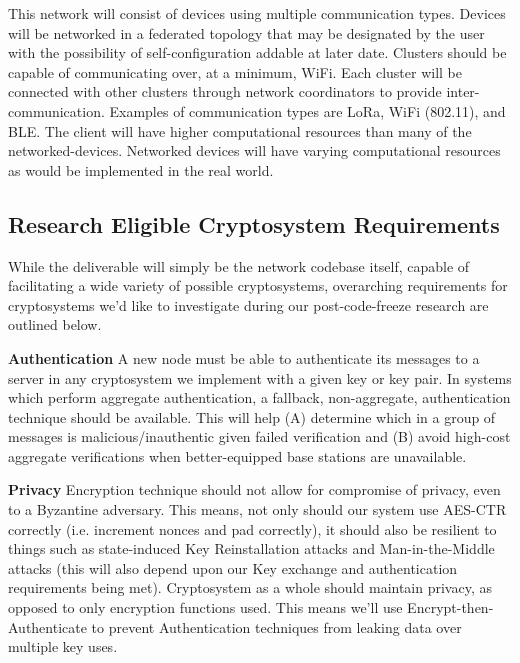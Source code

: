 \documentclass[tikz,a4paper,titlepage]{article}
\begin{document}
This network will consist of devices using multiple communication types. Devices will be networked in a federated topology that may be designated by the user with the possibility of self-configuration addable at later date. Clusters should be capable of communicating over, at a minimum, WiFi. Each cluster will be connected with other clusters through network coordinators to provide inter-communication. Examples of communication types are LoRa, WiFi (802.11), and BLE. The client will have higher computational resources than many of the networked-devices. Networked devices will have varying computational resources as would be implemented in the real world. 

\subsection{Research Eligible Cryptosystem Requirements} %

While the deliverable will simply be the network codebase itself, capable of facilitating a wide variety of possible cryptosystems, overarching requirements for cryptosystems we'd like to investigate during our post-code-freeze research are outlined below.
    
\textbf{Authentication}
A new node must be able to authenticate its messages to a server in any cryptosystem we implement with a given key or key pair. In systems which perform aggregate authentication, a fallback, non-aggregate, authentication technique should be available. This will help (A) determine which in a group of messages is malicious/inauthentic given failed verification and (B) avoid high-cost aggregate verifications when better-equipped base stations are unavailable.
    
\textbf{Privacy}
Encryption technique should not allow for compromise of privacy, even to a Byzantine adversary. This means, not only should our system use AES-CTR correctly (i.e. increment nonces and pad correctly), it should also be resilient to things such as state-induced Key Reinstallation attacks and Man-in-the-Middle attacks (this will also depend upon our Key exchange and authentication requirements being met). Cryptosystem as a whole should maintain privacy, as opposed to only encryption functions used. This means we'll use Encrypt-then-Authenticate to prevent Authentication techniques from leaking data over multiple key uses.
    
\end{document}
